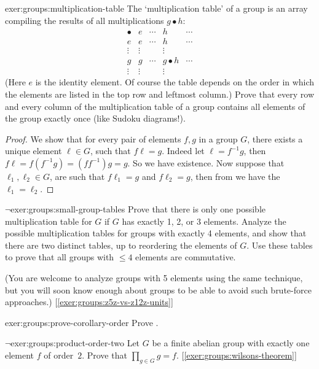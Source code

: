 \begin{exer}{}{exer:groups:multiplication-table}
  The `multiplication table' of a group is an array compiling the
  results of all multiplications $g \bullet h$:
  \[
    \begin{array}{c|cccc}
      \bullet & e & \cdots & h & \cdots \\\hline
      e       & e & \cdots & h & \cdots \\
      \vdots  & \vdots & & \vdots & \\
      g       & g & \cdots & g \bullet h & \cdots \\
      \vdots  & \vdots & & \vdots &
    \end{array}
  \]
  (Here $e$ is the identity element. Of course the table depends on
  the order in which the elements are listed in the top row and
  leftmost column.) Prove that every row and every column of the
  multiplication table of a group contains all elements of the group
  exactly once (like Sudoku diagrams!).
\end{exer}
\begin{proof}
  We show that for every pair of elements $f,g$ in a group $G$, there
  exists a unique element $\ell\in G$, such that $f \ell = g$.  Indeed
  let $\ell = f^{-1} g$, then
  $f \ell = f (f^{-1} g) = (f f^{-1}) g = g$.  So we have existence.
  Now suppose that $\ell_1,\ell_2\in G$, are such that $f \ell_1 = g$
  and $f \ell_2 = g$, then from  we
  have the $\ell_1 = \ell_2$.
\end{proof}
\begin{exer}{$\lnot$}{exer:groups:small-group-tables}
  Prove that there is only one possible multiplication table for $G$
  if $G$ has exactly 1, 2, or 3 elements. Analyze the possible
  multiplication tables for groups with exactly 4 elements, and show
  that there are two distinct tables, up to reordering the elements of
  $G$. Use these tables to prove that all groups with $\leq 4$
  elements are commutative.

  (You are welcome to analyze groups with 5 elements using the same
  technique, but you will soon know enough about groups to be able to
  avoid such brute-force approaches.)
  [\ref{exer:groups:z5z-vs-z12z-units}]
\end{exer}
\begin{exer}{}{exer:groups:prove-corollary-order}
  Prove .
\end{exer}
\begin{exer}{$\lnot$}{exer:groups:product-order-two}
  Let $G$ be a finite abelian group with exactly one element $f$ of
  order~$2$.  Prove that $\prod_{g \in G} g =
  f$. [\ref{exer:groups:wilsons-theorem}]
\end{exer}

